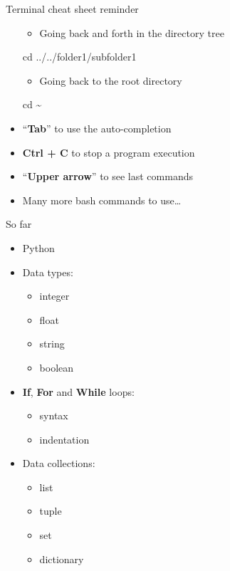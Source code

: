 \documentclass[
  8pt,
  ignorenonframetext,
]{beamer}
\newenvironment{Shaded}{\begin{snugshade}}{\end{snugshade}}
\newcommand{\BuiltInTok}[1]{#1}
\newcommand{\NormalTok}[1]{#1}
\providecommand{\tightlist}{%
  \setlength{\itemsep}{0pt}\setlength{\parskip}{0pt}}
\begin{document}
\begin{frame}[fragile]{Terminal cheat sheet reminder}
\begin{itemize}
  \begin{itemize}
  \tightlist
  \item
    Going back and forth in the directory tree
  \end{itemize}

\begin{Shaded}
\begin{Highlighting}[]
\BuiltInTok{cd}\NormalTok{ ../../folder1/subfolder1}
\end{Highlighting}
\end{Shaded}

  \begin{itemize}
  \tightlist
  \item
    Going back to the root directory
  \end{itemize}

\begin{Shaded}
\begin{Highlighting}[]
\BuiltInTok{cd}\NormalTok{ \textasciitilde{}}
\end{Highlighting}
\end{Shaded}
\item
  ``\textbf{Tab}'' to use the auto-completion
\item
  \textbf{Ctrl + C} to stop a program execution
\item
  ``\textbf{Upper arrow}'' to see last commands
\item
  Many more bash commands to use\ldots{}
\end{itemize}
\end{frame}

\begin{frame}{So far}
\protect\hypertarget{so-far}{}
\begin{itemize}
\item
  Python
\item
  Data types:

  \begin{itemize}
  \tightlist
  \item
    integer
  \item
    float
  \item
    string
  \item
    boolean
  \end{itemize}
\item
  \textbf{If}, \textbf{For} and \textbf{While} loops:

  \begin{itemize}
  \tightlist
  \item
    syntax
  \item
    indentation
  \end{itemize}
\item
  Data collections:

  \begin{itemize}
  \tightlist
  \item
    list
  \item
    tuple
  \item
    set
  \item
    dictionary
  \end{itemize}
\end{itemize}
\end{frame}
\end{document}
